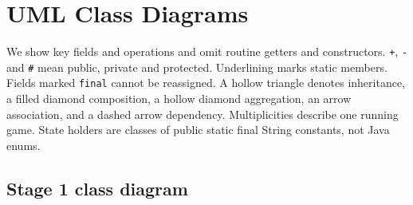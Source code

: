 \section{UML Class Diagrams}
\label{sec:class}
We show key fields and operations and omit routine getters and constructors.
\texttt{+}, \texttt{-} and \texttt{\#} mean public, private and protected.
Underlining marks static members. Fields marked \texttt{final} cannot be reassigned.
A hollow triangle denotes inheritance, a filled diamond composition, a hollow
diamond aggregation, an arrow association, and a dashed arrow dependency.
Multiplicities describe one running game. State holders are classes of public
static final String constants, not Java enums.


\subsection{Stage 1 class diagram}

